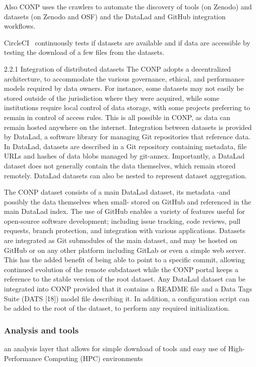 Also CONP uses the crawlers to automate the discovery of tools (on Zenodo) and datasets (on Zenodo and OSF) and the DataLad and GitHub integration workflows.

CircleCI~\cite{} continuously tests if datasets are available and if data are accessible by testing the download of a few files from the datasets. 


2.2.1 Integration of distributed datasets
The CONP adopts a decentralized architecture, to accommodate the various governance, ethical, and performance models required by data owners. For instance, some datasets may not easily be stored outside of the jurisdiction where they were acquired, while some institutions require local control of data storage, with some projects preferring to remain in control of access rules. This is all possible in CONP, as data can remain hosted anywhere on the internet.
Integration between datasets is provided by DataLad, a software library for managing Git repositories that reference data. In DataLad, datasets are described in a Git repository containing metadata, file URLs and hashes of data blobs managed by git-annex. Importantly, a DataLad dataset does not generally contain the data themselves, which remain stored remotely. DataLad datasets can also be nested to represent dataset aggregation.

The CONP dataset consists of a main DataLad dataset, its metadata -and possibly the data themselves when small- stored on GitHub and referenced in the main DataLad index. The use of GitHub enables a variety of features useful for open-source software development; including issue tracking, code reviews, pull requests, branch protection, and integration with various applications. Datasets are integrated as Git submodules of the main dataset, and may be hosted on GitHub or on any other platform including GitLab or even a simple web server. This has the added benefit of being able to point to a specific commit, allowing continued evolution of the remote subdataset while the CONP portal keeps a reference to the stable version of the root dataset. Any DataLad dataset can be integrated into CONP provided that it contains a README file and a Data Tags Suite (DATS [18]) model file describing it. In addition, a configuration script can be added to the root of the dataset, to perform any required initialization.








\subsubsection{Analysis and tools}
an analysis layer that allows for simple download of tools and easy use of High-Performance Computing (HPC) environments

